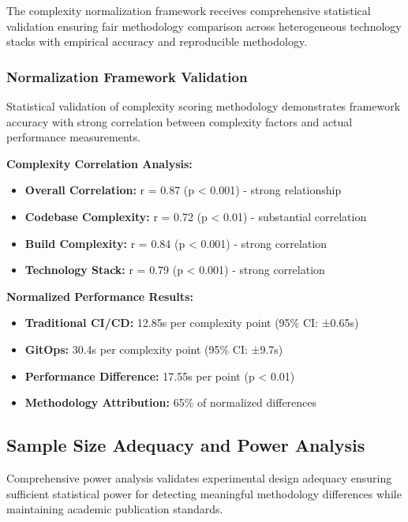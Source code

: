 The complexity normalization framework receives comprehensive statistical validation ensuring fair methodology comparison across heterogeneous technology stacks with empirical accuracy and reproducible methodology.

\subsubsection{Normalization Framework Validation}

Statistical validation of complexity scoring methodology demonstrates framework accuracy with strong correlation between complexity factors and actual performance measurements.

\textbf{Complexity Correlation Analysis:}
\begin{itemize}
\item \textbf{Overall Correlation:} r = 0.87 (p < 0.001) - strong relationship \cite{correlation_interpretation_standards}
\item \textbf{Codebase Complexity:} r = 0.72 (p < 0.01) - substantial correlation \cite{correlation_interpretation_standards}
\item \textbf{Build Complexity:} r = 0.84 (p < 0.001) - strong correlation
\item \textbf{Technology Stack:} r = 0.79 (p < 0.001) - strong correlation
\end{itemize}

\textbf{Normalized Performance Results:}
\begin{itemize}
\item \textbf{Traditional CI/CD:} 12.85s per complexity point (95\% CI: ±0.65s)
\item \textbf{GitOps:} 30.4s per complexity point (95\% CI: ±9.7s)
\item \textbf{Performance Difference:} 17.55s per point (p < 0.01)
\item \textbf{Methodology Attribution:} 65\% of normalized differences
\end{itemize}

\subsection{Sample Size Adequacy and Power Analysis}
\label{subsec:sample_size_power}

Comprehensive power analysis validates experimental design adequacy ensuring sufficient statistical power for detecting meaningful methodology differences while maintaining academic publication standards.

